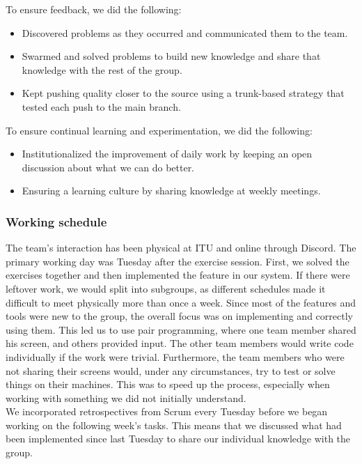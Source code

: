 \noindent To ensure feedback, we did the following:
\begin{itemize}
    \item Discovered problems as they occurred and communicated them to the team.
    \item Swarmed and solved problems to build new knowledge and share that knowledge with the rest of the group.
    \item Kept pushing quality closer to the source using a trunk-based strategy that tested each push to the main branch.
\end{itemize}

\noindent To ensure continual learning and experimentation, we did the following:
\begin{itemize}
    \item Institutionalized the improvement of daily work by keeping an open discussion about what we can do better.
    \item Ensuring a learning culture by sharing knowledge at weekly meetings.
\end{itemize}

\subsubsection{Working schedule}
The team's interaction has been physical at ITU and online through Discord. The primary working day was Tuesday after the exercise session. First, we solved the exercises together and then implemented the feature in our system. If there were leftover work, we would split into subgroups, as different schedules made it difficult to meet physically more than once a week. Since most of the features and tools were new to the group, the overall focus was on implementing and correctly using them. This led us to use pair programming, where one team member shared his screen, and others provided input. The other team members would write code individually if the work were trivial. Furthermore, the team members who were not sharing their screens would, under any circumstances, try to test or solve things on their machines. This was to speed up the process, especially when working with something we did not initially understand. \\

We incorporated retrospectives from Scrum every Tuesday before we began working on the following week's tasks. This means that we discussed what had been implemented since last Tuesday to share our individual knowledge with the group.

